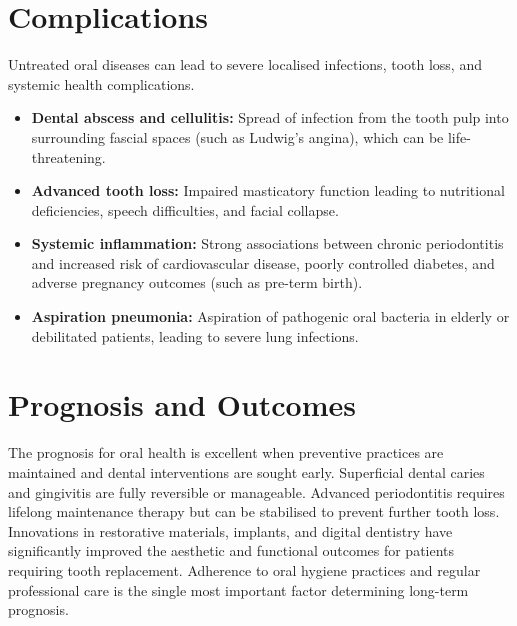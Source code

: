 \section*{Complications}
Untreated oral diseases can lead to severe localised infections, tooth loss, and systemic health complications.
\begin{itemize}
    \item \textbf{Dental abscess and cellulitis:} Spread of infection from the tooth pulp into surrounding fascial spaces (such as Ludwig's angina), which can be life-threatening.
    \item \textbf{Advanced tooth loss:} Impaired masticatory function leading to nutritional deficiencies, speech difficulties, and facial collapse.
    \item \textbf{Systemic inflammation:} Strong associations between chronic periodontitis and increased risk of cardiovascular disease, poorly controlled diabetes, and adverse pregnancy outcomes (such as pre-term birth).
    \item \textbf{Aspiration pneumonia:} Aspiration of pathogenic oral bacteria in elderly or debilitated patients, leading to severe lung infections.
\end{itemize}

\section*{Prognosis and Outcomes}
The prognosis for oral health is excellent when preventive practices are maintained and dental interventions are sought early. Superficial dental caries and gingivitis are fully reversible or manageable. Advanced periodontitis requires lifelong maintenance therapy but can be stabilised to prevent further tooth loss. Innovations in restorative materials, implants, and digital dentistry have significantly improved the aesthetic and functional outcomes for patients requiring tooth replacement. Adherence to oral hygiene practices and regular professional care is the single most important factor determining long-term prognosis.

